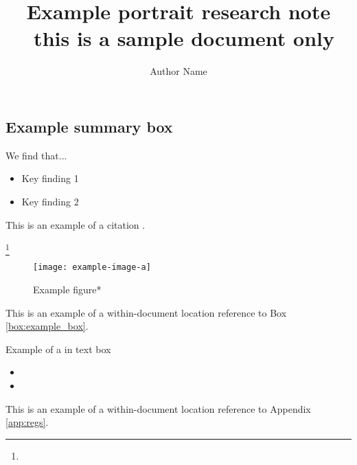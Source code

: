 \documentclass[10pt,openany,leqno]{e61-portrait-research-note}
\begin{document}
\baselineskip=14pt
\emergencystretch=5pt
\sloppy

\title{Example portrait research note ~\newline this is a sample document only}
\author{Author Name}

\maketitle

\begin{summarybox}
\subsection*{Example summary box}\vspace{0.1cm}
We find that...
\begin{itemize}[noitemsep]
    \item Key finding 1
    \item Key finding 2
\end{itemize}
\end{summarybox}

\lipsum[1] 

This is an example of a citation \parencite{Fitzgerald20,Ziffer20}.

\lipsum[2]\footnote{\lipsum[3]}

\begin{figure}[h]
\caption{Example figure*}
\label{fig:example_a}
\texttt{[image: example-image-a]}\centering
\end{figure}

This is an example of a within-document location reference to Box \ref{box:example_box}. 

\begin{Boxx}[label=box:example_box]{Example of a in text box}
\lipsum[][1-2]
\begin{itemize}[noitemsep]
    \item \lipsum[2][1]
    \item \lipsum[3][1]
\end{itemize}
\end{Boxx}

\lipsum[4] This is an example of a within-document location reference to Appendix \ref{app:regs}. 
\end{document}
